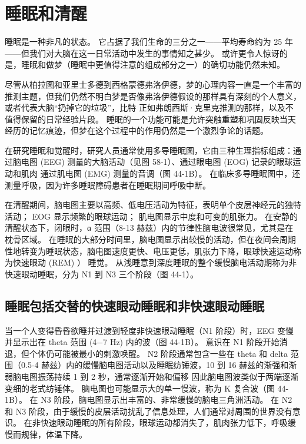 \chapter{睡眠和清醒}

睡眠是一种非凡的状态。 它占据了我们生命的三分之一——平均寿命约为 25 年——但我们对大脑在这一日常活动中发生的事情知之甚少。 或许更令人惊讶的是，睡眠和做梦（睡眠中更值得注意的组成部分之一）的确切功能仍然未知。

尽管从柏拉图和亚里士多德到西格蒙德弗洛伊德，梦的心理内容一直是一个丰富的推测主题，但我们仍然不明白梦是否像弗洛伊德假设的那样具有深刻的个人意义，或者代表大脑“扔掉它的垃圾”，比特 正如弗朗西斯·克里克推测的那样，以及不值得保留的日常经验片段。 睡眠的一个功能可能是允许突触重塑和巩固反映当天经历的记忆痕迹，但梦在这个过程中的作用仍然是一个激烈争论的话题。

在研究睡眠和觉醒时，研究人员通常使用多导睡眠图，它由三种生理指标组成：通过脑电图 (EEG) 测量的大脑活动（见图 58-1）、通过眼电图 (EOG) 记录的眼球运动和肌肉 通过肌电图 (EMG) 测量的音调（图 44-1B）。 在临床多导睡眠图中，还测量呼吸，因为许多睡眠障碍患者在睡眠期间呼吸中断。

在清醒期间，脑电图主要以高频、低电压活动为特征，表明单个皮层神经元的独特活动； EOG 显示频繁的眼球运动； 肌电图显示中度和可变的肌张力。 在安静的清醒状态下，闭眼时，α 范围（8-13 赫兹）内的节律性脑电波很常见，尤其是在枕骨区域。 在睡眠的大部分时间里，脑电图显示出较慢的活动，但在夜间会周期性地转变为睡眠状态，脑电图速度更快、电压更低，肌张力下降，眼球快速运动称为快速眼动 (REM) ） 睡觉。 从浅睡意到深度睡眠的整个缓慢脑电活动期称为非快速眼动睡眠，分为 N1 到 N3 三个阶段（图 44-1）。


\section{睡眠包括交替的快速眼动睡眠和非快速眼动睡眠}

当一个人变得昏昏欲睡并过渡到轻度非快速眼动睡眠（N1 阶段）时，EEG 变慢并显示出在 theta 范围 (4−7 Hz) 内的波（图 44-1B）。 意识在 N1 阶段开始消退，但个体仍可能被最小的刺激唤醒。 N2 阶段通常包含一些在 theta 和 delta 范围（0.5-4 赫兹）内的缓慢脑电图活动以及睡眠纺锤波，10 到 16 赫兹的渐强和渐弱脑电图振荡持续 1 到 2 秒，通常逐渐开始和偏移 因此脑电图波类似于两端逐渐变细的老式纺锤体。 脑电图也可能显示大的单一慢波，称为 K 复合波（图 44-1B）。 在 N3 阶段，脑电图显示出丰富的、非常缓慢的脑电三角洲活动。 在 N2 和 N3 阶段，由于缓慢的皮层活动扰乱了信息处理，人们通常对周围的世界没有意识。 在非快速眼动睡眠的所有阶段，眼球运动都消失了，肌肉张力低下，呼吸缓慢而规律，体温下降。

